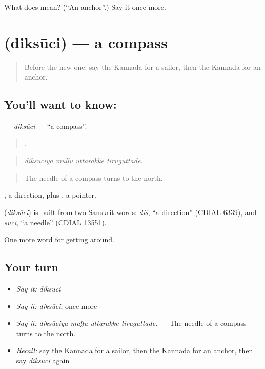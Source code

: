 \begin{tcolorbox}[breakable,colback=teal!4,colframe=teal!35!black,title={Before you move on}]
What does  mean? (\textquotedblleft{}An anchor\textquotedblright{}.) Say it once more.
\end{tcolorbox}
\section[\texorpdfstring{\kn{ದಿಕ್ಸೂಚಿ} (diksūci)}{ದಿಕ್ಸೂಚಿ (diksūci)}]{ (diksūci) — a compass}

\label{lesson:KA-C453-diksuci}



\begin{quote}
Before the new one: say the Kannada for a sailor, then the Kannada for an anchor.
\end{quote}

\subsection*{You'll want to know: }
\textbf{} — \emph{diksūci} — \textquotedblleft{}a compass\textquotedblright{}.

\begin{quote}
   .
\end{quote}

\begin{quote}
\emph{diksūciya muḷḷu uttarakke tiruguttade.}
\end{quote}

\begin{quote}
The needle of a compass turns to the north.
\end{quote}

, a direction, plus , a pointer.

\begin{cousinweb}
\textbf{} (\emph{diksūci}) is built from two Sanskrit words: \emph{diś}, \textquotedblleft{}a direction\textquotedblright{} (CDIAL 6339), and \emph{sūci}, \textquotedblleft{}a needle\textquotedblright{} (CDIAL 13551).
\end{cousinweb}

\begin{grammarlens}[title={What you've built}]
One more word for getting around.
\end{grammarlens}

\subsection*{Your turn}
\begin{itemize}
\raggedright
  \item \emph{Say it:} \emph{diksūci}
  \item \emph{Say it:} \emph{diksūci}, once more
  \item \emph{Say it:} \emph{diksūciya muḷḷu uttarakke tiruguttade.} — The needle of a compass turns to the north.
  \item \emph{Recall:} say the Kannada for a sailor, then the Kannada for an anchor, then say \emph{diksūci} again
\end{itemize}


